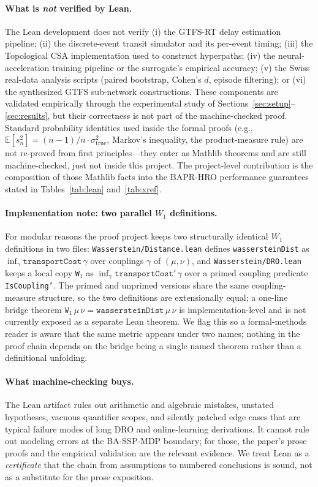 \documentclass[11pt]{article}
\theoremstyle{definition}
\theoremstyle{remark}
\begin{document}
\paragraph{What is \emph{not} verified by Lean.}
The Lean development does not verify (i) the GTFS-RT delay
estimation pipeline; (ii) the discrete-event transit simulator and
its per-event timing; (iii) the Topological CSA implementation used
to construct hyperpaths; (iv) the neural-acceleration training
pipeline or the surrogate's empirical accuracy; (v) the Swiss
real-data analysis scripts (paired bootstrap, Cohen's $d$, episode
filtering); or (vi) the synthesized GTFS sub-network constructions.
These components are validated empirically through the experimental
study of Sections~\ref{sec:setup}--\ref{sec:results}, but their
correctness is not part of the machine-checked proof. Standard
probability identities used inside the formal proofs (e.g.,
$\mathbb{E}[s_n^2] = (n-1)/n \cdot \sigma_{\mathrm{true}}^2$,
Markov's inequality, the product-measure rule) are not re-proved
from first principles---they enter as Mathlib theorems and are still
machine-checked, just not inside this project. The project-level
contribution is the composition of those Mathlib facts into the
BAPR-HRO performance guarantees stated in Tables~\ref{tab:lean}
and~\ref{tab:xref}.

\paragraph{Implementation note: two parallel $W_1$ definitions.}
For modular reasons the proof project keeps two structurally
identical $W_1$ definitions in two files: \texttt{Wasserstein/Distance.lean}
defines \texttt{wassersteinDist} as $\inf_\gamma \mathtt{transportCost}\,\gamma$
over couplings $\gamma$ of $(\mu,\nu)$, and
\texttt{Wasserstein/DRO.lean} keeps a local copy \texttt{W$_1$} as
$\inf_\gamma \mathtt{transportCost'}\,\gamma$ over a primed coupling
predicate \texttt{IsCoupling'}. The primed and unprimed versions
share the same coupling-measure structure, so the two definitions
are extensionally equal; a one-line bridge theorem
$\mathtt{W}_1\,\mu\,\nu = \mathtt{wassersteinDist}\,\mu\,\nu$ is
implementation-level and is not currently exposed as a separate
Lean theorem. We flag this so a formal-methods reader is aware
that the same metric appears under two names; nothing in the proof
chain depends on the bridge being a single named theorem rather
than a definitional unfolding.

\paragraph{What machine-checking buys.}
The Lean artifact rules out arithmetic and algebraic mistakes,
unstated hypotheses, vacuous quantifier scopes, and silently
patched edge cases that are typical failure modes of long DRO and
online-learning derivations. It cannot rule out modeling errors at
the BA-SSP-MDP boundary; for those, the paper's prose proofs and the
empirical validation are the relevant evidence. We treat Lean as a
\emph{certificate} that the chain from assumptions to numbered
conclusions is sound, not as a substitute for the prose exposition.
\end{document}
